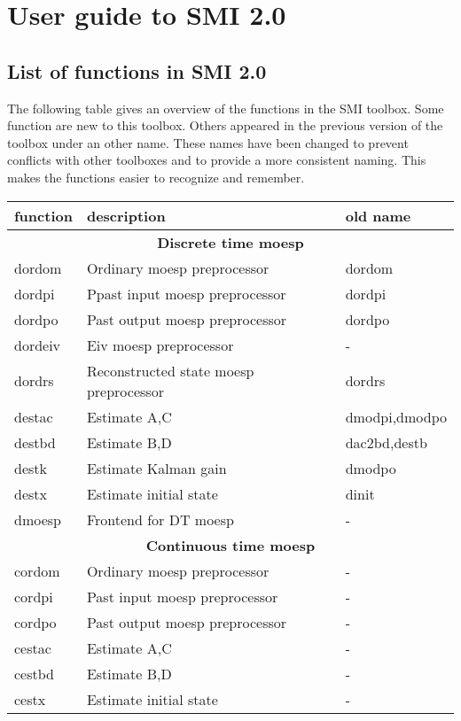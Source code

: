 \documentclass{book}
\begin{document}
\tableofcontents  
\chapter{User guide to SMI 2.0}

\section{List of functions in SMI 2.0}
The following table gives an overview of the functions in the SMI
toolbox. Some function are new to this toolbox. Others appeared in the
previous version of the toolbox under an other name. These names have
been changed to prevent conflicts with other toolboxes and to provide
a more consistent naming. This makes the functions easier to recognize
and remember.

\label{app:smi} \begin{tabular}{|l|l|l|}
 \hline
 \textbf{function}&\textbf{description}& \textbf{old name}\\\hline
 \multicolumn{3}{|c|}{\textbf{Discrete time moesp}}\\\hline
 dordom&Ordinary moesp preprocessor&dordom\\\hline 
 dordpi&Ppast input moesp preprocessor&dordpi\\\hline
 dordpo&Past output moesp preprocessor&dordpo\\\hline
 dordeiv&Eiv moesp preprocessor&-\\\hline
 dordrs&Reconstructed state moesp preprocessor&dordrs\\\hline
 destac&Estimate A,C&dmodpi,dmodpo\\\hline 
 destbd&Estimate B,D&dac2bd,destb\\\hline
 destk&Estimate Kalman gain&dmodpo\\\hline
 destx &Estimate initial state &dinit \\\hline
 dmoesp&Frontend for DT moesp&-\\\hline
 \multicolumn{3}{|c|}{\textbf{Continuous time moesp}}\\\hline
 cordom&Ordinary moesp preprocessor&-\\\hline 
 cordpi&Past input moesp preprocessor&-\\\hline
 cordpo&Past output moesp preprocessor&-\\\hline
 cestac&Estimate A,C&-\\\hline 
 cestbd&Estimate B,D&-\\\hline
 cestx &Estimate initial state &- \\\hline

\end{tabular}
\end{document}
